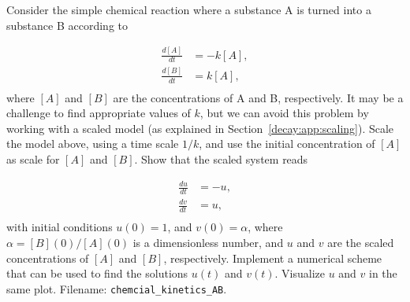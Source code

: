 \documentclass[graybox,sectrefs,envcountresetchap,open=right,final]{svmonodo}
\makeatletter
\newenvironment{doconceexercise}{}{}
\newcounter{doconceexercisecounter}%
\newcommand\listofexercises{
\chapter*{List of Exercises, Problems, and Projects
          \@mkboth{List of Exercises, Problems, and Projects}{List of Exercises, Problems, and Projects}}
\markboth{List of Exercises, Problems, and Projects}{List of Exercises, Problems, and Projects}
\@starttoc{loe}
}
\makeatother
\begin{document}
\begin{doconceexercise}

                
\label{decay:app:exer:kinetics:AB}

Consider the simple chemical reaction where a substance A is turned
into a substance B according to

\begin{align*}
\frac{d[A]}{dt} &= -k[A],\\ 
\frac{d[B]}{dt} &= k[A],\\ 
\end{align*}
where $[A]$ and $[B]$ are the concentrations of A and B, respectively.
It may be a challenge to find appropriate values of $k$, but we can avoid
this problem by working with a scaled model (as explained in
Section~\ref{decay:app:scaling}).
Scale the model above, using a time scale $1/k$, and use
the initial concentration
of $[A]$ as scale for $[A]$ and $[B]$. Show that the scaled system
reads

\begin{align*}
\frac{du}{dt} &= -u,\\ 
\frac{dv}{dt} &= u,\\ 
\end{align*}
with initial conditions $u(0)=1$, and $v(0)=\alpha$, where
$\alpha = [B](0)/[A](0)$ is a dimensionless number, and
$u$ and $v$ are the scaled concentrations of $[A]$ and $[B]$,
respectively. Implement a numerical scheme that can be used to
find the solutions
$u(t)$ and $v(t)$. Visualize $u$ and $v$ in the same plot.
\noindent Filename: \Verb!chemcial_kinetics_AB!.

\end{doconceexercise}
\end{document}
